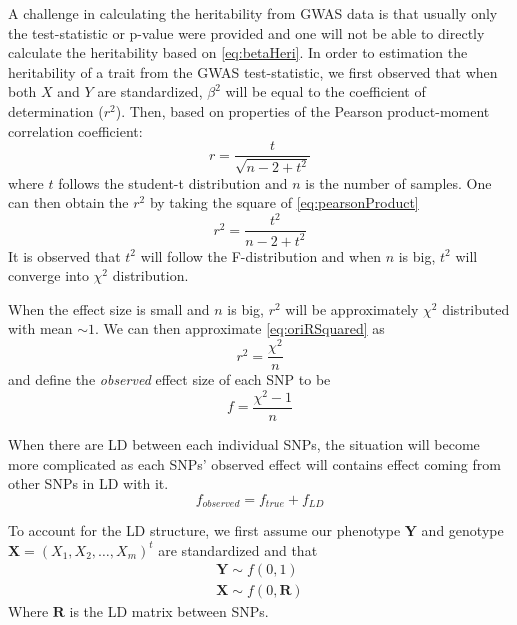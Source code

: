 \documentclass{book}
\begin{document}
			A challenge in calculating the heritability from \gls{GWAS} data is that usually only the test-statistic or p-value were provided and one will not be able to directly calculate the heritability based on \cref{eq:betaHeri}. In order to estimation the heritability of a trait from the \gls{GWAS} test-statistic, we first observed that when both $X$ and $Y$ are standardized, $\beta^2$ will be equal to the coefficient of determination ($r^2$). Then, based on properties of the Pearson product-moment correlation coefficient:
			\begin{equation}
				r = \frac{t}{\sqrt{n-2+t^2}}
				\label{eq:pearsonProduct}
			\end{equation}
			where $t$ follows the student-t distribution and $n$ is the number of samples.
			One can then obtain the $r^2$ by taking the square of \cref{eq:pearsonProduct}
			\begin{equation}
				r^2 = \frac{t^2}{n-2+t^2}
				\label{eq:oriRSquared}
			\end{equation}
			It is observed that $t^2$ will follow the F-distribution and when $n$ is big, $t^2$ will converge into $\chi^2$ distribution.
			
			When the effect size is small and $n$ is big, $r^2$ will be approximately $\chi^2$ distributed with mean $\sim 1$. 
			We can then approximate \cref{eq:oriRSquared} as
			\begin{equation}
				r^2= \frac{\chi^2}{n}
				\label{eq:approxChi}
			\end{equation}
			and define the \emph{observed} effect size of each \gls{SNP} to be
			\begin{equation}
			f=\frac{\chi^2-1}{n}
			\label{eq:observedEffect}
			\end{equation}
			
			When there are \gls{LD} between each individual \glspl{SNP}, the situation will become more complicated as each \glspl{SNP}' observed effect will contains effect coming from other \glspl{SNP} in \gls{LD} with it. 
			\begin{equation}
			f_{observed} = f_{true}+f_{LD}
			\label{eq:conceptF}
			\end{equation}
			
			To account for the \gls{LD} structure, we first assume our phenotype $\boldsymbol{Y}$ and genotype $\boldsymbol{X}=(X_1,X_2,\dots,X_m)^t$ are standardized and that
			\begin{align*}
				\boldsymbol{Y}\sim f(0,1) \\
				\boldsymbol{X}\sim f(0,\boldsymbol{R})
			\end{align*}
			Where $\boldsymbol{R}$ is the \gls{LD} matrix between \glspl{SNP}.
			
\end{document}
